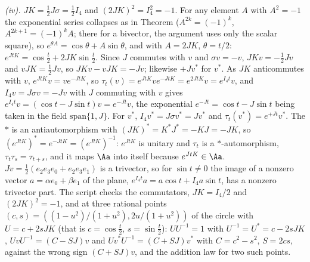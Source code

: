 \emph{(iv).} $JK = \tfrac12J\sigma = \tfrac12I_{4}$ and $(2JK)^{2} = I_{4}^{2} = -1$. For any element $A$ with $A^{2} = -1$ the exponential series collapses as in Theorem  ($A^{2k} = (-1)^{k}$, $A^{2k+1} = (-1)^{k}A$; there for a bivector, the argument uses only the scalar square), so $e^{\theta A} = \cos\theta + A\sin\theta$, and with $A = 2JK$, $\theta = t/2$: $e^{JtK} = \cos\tfrac{t}{2} + 2JK\sin\tfrac{t}{2}$. Since $J$ commutes with $v$ and $\sigma v = -v$, $JKv = -\tfrac12Jv$ and $vJK = \tfrac12Jv$, so $JKv - vJK = -Jv$; likewise $+Jv^{*}$ for $v^{*}$. As $JK$ anticommutes with $v$, $e^{JtK}v = ve^{-JtK}$, so $\tau_{t}(v) = e^{JtK}ve^{-JtK} = e^{2JtK}v = e^{I_{4}t}v$, and $I_{4}v = J\sigma v = -Jv$ with $J$ commuting with $v$ gives $e^{I_{4}t}v = (\cos t - J\sin t)v = e^{-Jt}v$, the exponential $e^{-Jt} = \cos t - J\sin t$ being taken in the field $\mathrm{span}\{1, J\}$. For $v^{*}$, $I_{4}v^{*} = J\sigma v^{*} = Jv^{*}$ and $\tau_{t}(v^{*}) = e^{+Jt}v^{*}$. The $*$ is an antiautomorphism with $(JK)^{*} = K^{*}J^{*} = -KJ = -JK$, so $(e^{JtK})^{*} = e^{-JtK} = (e^{JtK})^{-1}$: $e^{JtK}$ is unitary and $\tau_{t}$ is a $*$-automorphism, $\tau_{t}\tau_{s} = \tau_{t+s}$, and it maps $\Aa$ into itself because $e^{JtK} \in \Aa$. $Jv = \tfrac12(e_{2}e_{3}e_{0} + e_{2}e_{3}e_{1})$ is a trivector, so for $\sin t \neq 0$ the image of a nonzero vector $a = \alpha e_{0} + \beta e_{1}$ of the plane, $e^{I_{4}t}a = a\cos t + I_{4}a\sin t$, has a nonzero trivector part. The script checks the commutators, $JK = I_{4}/2$ and $(2JK)^{2} = -1$, and at three rational points $(c, s) = ((1 - u^{2})/(1 + u^{2}), 2u/(1 + u^{2}))$ of the circle with $U = c + 2sJK$ (that is $c = \cos\tfrac{t}{2}$, $s = \sin\tfrac{t}{2}$): $UU^{-1} = 1$ with $U^{-1} = U^{*} = c - 2sJK$, $UvU^{-1} = (C - SJ)v$ and $Uv^{*}U^{-1} = (C + SJ)v^{*}$ with $C = c^{2} - s^{2}$, $S = 2cs$, against the wrong sign $(C + SJ)v$, and the addition law for two such points.

